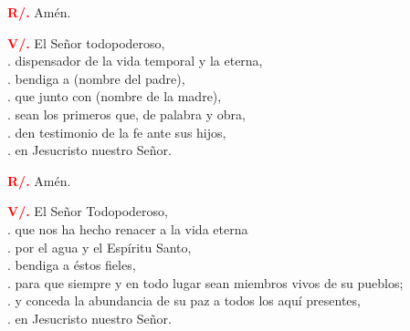 \documentclass[12pt, letterpaper]{report}
\begin{document}
\noindent
\Large {\bfseries \textcolor{red}{R/.}} \hspace{0.5cm} Am\'en.\newline

\newpage

\noindent
\Large {\bfseries \textcolor{red}{V/.}} \hspace{0.5cm} El Se\~nor todopoderoso, \\
. \hspace{1.5cm} dispensador de la vida temporal y la eterna, \\
. \hspace{1.5cm} bendiga a (nombre del padre), \\
. \hspace{1.5cm} que junto con (nombre de la madre), \\
. \hspace{1.5cm} sean los primeros que, de palabra y obra, \\
. \hspace{1.5cm} den testimonio de la fe ante sus hijos, \\
. \hspace{1.5cm} en Jesucristo nuestro Se\~nor. \newline

\noindent
\Large {\bfseries \textcolor{red}{R/.}} \hspace{0.5cm} Am\'en.\newline

\noindent
\Large {\bfseries \textcolor{red}{V/.}} \hspace{0.5cm} El Se\~nor Todopoderoso, \\
. \hspace{1.5cm} que nos ha hecho renacer a la vida eterna \\
. \hspace{1.5cm} por el agua y el Esp\'iritu Santo, \\
. \hspace{1.5cm} bendiga a \'estos fieles, \\
. \hspace{1.5cm} para que siempre y en todo lugar sean miembros vivos de su pueblos; \\
. \hspace{1.5cm} y conceda la abundancia de su paz a todos los aqu\'i presentes, \\
. \hspace{1.5cm} en Jesucristo nuestro Se\~nor. \newline
\end{document}
